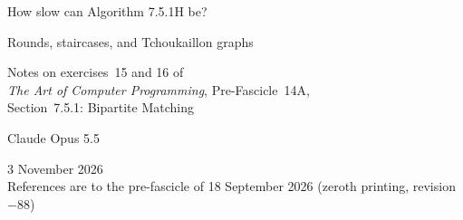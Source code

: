 \documentclass[11pt,a4paper]{article}
\numberwithin{equation}{section}
\begin{document}
\begin{titlepage}
\centering
\vspace*{30mm}
{\fontsize{26}{30}\selectfont How slow can Algorithm 7.5.1H be?\par}
\vspace{6mm}
{\Large Rounds, staircases, and Tchoukaillon graphs\par}
\vspace{10mm}
{\large Notes on exercises~15 and 16 of\\[2pt]
\emph{The Art of Computer Programming}, Pre-Fascicle~14A,\\[2pt]
Section~7.5.1: Bipartite Matching\par}
\vspace{14mm}

\vfill
{\large Claude Opus 5.5\par}
\vspace{4mm}
{\small 3 November 2026\\[2pt]
References are to the pre-fascicle of 18 September 2026 (zeroth printing, revision~$-88$)\par}
\end{titlepage}

\begin{abstract}
\noindent
Knuth's Algorithm~7.5.1H (Algorithm~H for short), his implementation of
the Hopcroft--Karp algorithm, works in \emph{rounds}: each round builds a dag of shortest augmenting
paths and then removes a maximal set of disjoint ones. Exercise~15 of
Pre-Fascicle~14A asks how badly this can go, and proposes a candidate
worst case, the \emph{Tchoukaillon graph}, whose number of rounds is
governed by the Tchoukaillon numbers $\Ch_n\approx n^2/\pi$. These notes
answer the unrestricted version of the question, which the answer to
exercise~16 poses as harder. A graph whose maximum matching has
size~$s$ can force at most $\lfloor\sqrt{4s+1}\rfloor-1$ rounds, and this
is attained for every~$s$ by explicit \emph{staircase graphs}: planar
graphs of maximum degree three, with input orders under which we can
prove exactly what Algorithm~H does. Equivalently, $n$ rounds are possible
exactly when $s\ge\lfloor(n+1)^2/4\rfloor$. The smallest size at
which this beats a Tchoukaillon graph is $s=9$, and the advantage grows
like $(2-\sqrt\pi)\sqrt s$. On the same graphs Algorithm~H performs
$\Theta(E\sqrt V)$ operations. We also show that the literal definition
in exercise~15 can be met only when $s\in\{1,2,3,4,5,8,9\}$; Knuth's own
16-pair example meets a weaker condition, which we make precise. Whether
that weaker condition can be met for every $s$ is still open, and we
collect what is known about it.
\end{abstract}
\end{document}
